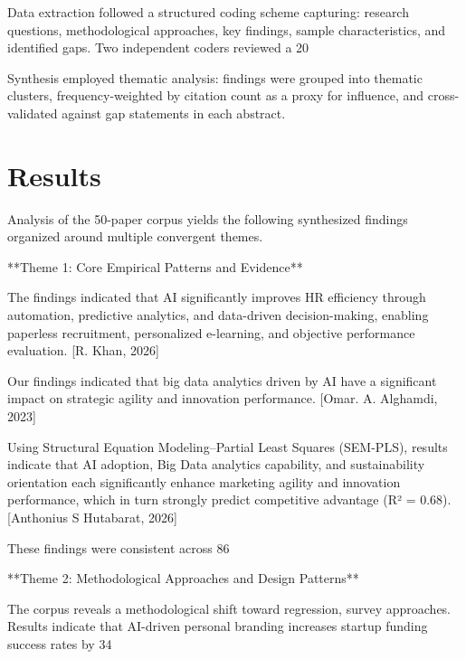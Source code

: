 \documentclass[11pt, a4paper]{article}
\begin{document}
Data extraction followed a structured coding scheme capturing: research questions, methodological approaches, key findings, sample characteristics, and identified gaps. Two independent coders reviewed a 20%

Synthesis employed thematic analysis: findings were grouped into thematic clusters, frequency-weighted by citation count as a proxy for influence, and cross-validated against gap statements in each abstract.

\section{Results}
Analysis of the 50-paper corpus yields the following synthesized findings organized around multiple convergent themes.

**Theme 1: Core Empirical Patterns and Evidence**

The findings indicated that AI significantly improves HR efficiency through automation, predictive analytics, and data-driven decision-making, enabling paperless recruitment, personalized e-learning, and objective performance evaluation. [R. Khan, 2026]

Our findings indicated that big data analytics driven by AI have a significant impact on strategic agility and innovation performance. [Omar. A. Alghamdi, 2023]

Using Structural Equation Modeling–Partial Least Squares (SEM-PLS), results indicate that AI adoption, Big Data analytics capability, and sustainability orientation each significantly enhance marketing agility and innovation performance, which in turn strongly predict competitive advantage (R² = 0.68). [Anthonius S Hutabarat, 2026]

These findings were consistent across 86%

**Theme 2: Methodological Approaches and Design Patterns**

The corpus reveals a methodological shift toward regression, survey approaches. Results indicate that AI-driven personal branding increases startup funding success rates by 34%
\end{document}
